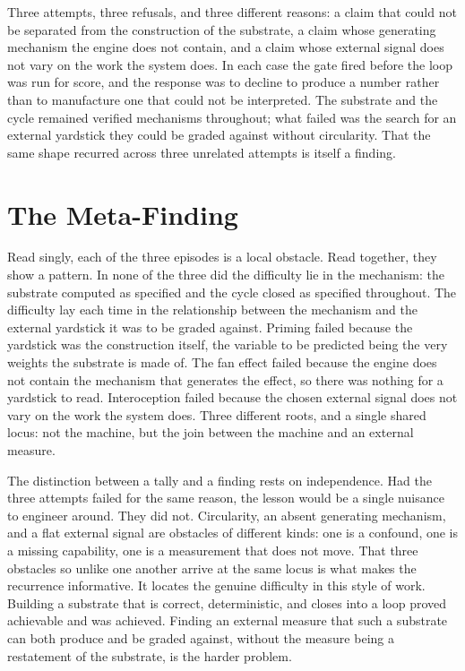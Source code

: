 \documentclass[conference]{IEEEtran}
\begin{document}
Three attempts, three refusals, and three different reasons: a claim that could not be
separated from the construction of the substrate, a claim whose generating mechanism the engine
does not contain, and a claim whose external signal does not vary on the work the system does.
In each case the gate fired before the loop was run for score, and the response was to decline
to produce a number rather than to manufacture one that could not be interpreted. The substrate
and the cycle remained verified mechanisms throughout; what failed was the search for an
external yardstick they could be graded against without circularity. That the same shape
recurred across three unrelated attempts is itself a finding.

\section{The Meta-Finding}\label{sec:metafinding}
Read singly, each of the three episodes is a local obstacle. Read together, they show a
pattern. In none of the three did the difficulty lie in the mechanism: the substrate computed
as specified and the cycle closed as specified throughout. The difficulty lay each time in the
relationship between the mechanism and the external yardstick it was to be graded against.
Priming failed because the yardstick was the construction itself, the variable to be predicted
being the very weights the substrate is made of. The fan effect failed because the engine does
not contain the mechanism that generates the effect, so there was nothing for a yardstick to
read. Interoception failed because the chosen external signal does not vary on the work the
system does. Three different roots, and a single shared locus: not the machine, but the join
between the machine and an external measure.

The distinction between a tally and a finding rests on independence. Had the three attempts
failed for the same reason, the lesson would be a single nuisance to engineer around. They did
not. Circularity, an absent generating mechanism, and a flat external signal are obstacles of
different kinds: one is a confound, one is a missing capability, one is a measurement that does
not move. That three obstacles so unlike one another arrive at the same locus is what makes the
recurrence informative. It locates the genuine difficulty in this style of work. Building a
substrate that is correct, deterministic, and closes into a loop proved achievable and was
achieved. Finding an external measure that such a substrate can both produce and be graded
against, without the measure being a restatement of the substrate, is the harder problem.
\end{document}
